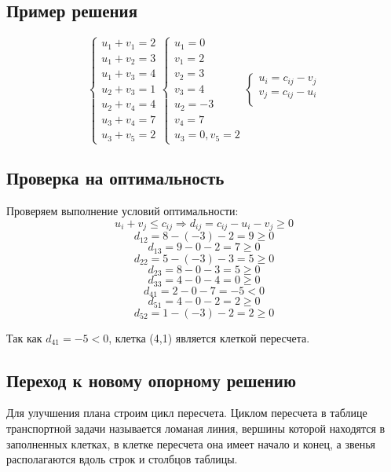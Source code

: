 \documentclass[17pt]{extarticle}
\begin{document}
\subsection{Пример решения}
\[
    \begin{cases}
        u_1 + v_1 = 2 \\
        u_1 + v_2 = 3 \\
        u_1 + v_3 = 4 \\
        u_2 + v_3 = 1 \\
        u_2 + v_4 = 4 \\
        u_3 + v_4 = 7 \\
        u_3 + v_5 = 2
    \end{cases}
    \begin{cases}
        u_1 = 0  \\
        v_1 = 2  \\
        v_2 = 3  \\
        v_3 = 4  \\
        u_2 = -3 \\
        v_4 = 7  \\
        u_3 = 0, v_5 = 2
    \end{cases}
    \begin{cases}
        u_i = c_{ij} - v_j \\
        v_j = c_{ij} - u_i \\
    \end{cases}
\]
\subsection{Проверка на оптимальность}
Проверяем выполнение условий оптимальности:
\[
    u_i + v_j \leq c_{ij} \Rightarrow d_{ij} = c_{ij} - u_i - v_j \geq 0
\]
\[
    d_{12} = 8 - (-3) - 2 = 9 \geq 0
\]
\[
    d_{13} = 9 - 0 - 2 = 7 \geq 0
\]
\[
    d_{22} = 5 - (-3) - 3 = 5 \geq 0
\]
\[
    d_{23} = 8 - 0 - 3 = 5 \geq 0
\]
\[
    d_{33} = 4 - 0 - 4 = 0 \geq 0
\]
\[
    d_{41} = 2 - 0 - 7 = -5 < 0
\]
\[
    d_{51} = 4 - 0 - 2 = 2 \geq 0
\]
\[
    d_{52} = 1 - (-3) - 2 = 2 \geq 0
\]

Так как \( d_{41} = -5 < 0 \), клетка (4,1) является клеткой пересчета.

\subsection{Переход к новому опорному решению}

Для улучшения плана строим цикл пересчета. Циклом пересчета в таблице транспортной задачи называется ломаная линия, вершины которой находятся в заполненных клетках, в клетке пересчета она имеет начало и конец, а звенья располагаются вдоль строк и столбцов таблицы.
\end{document}
